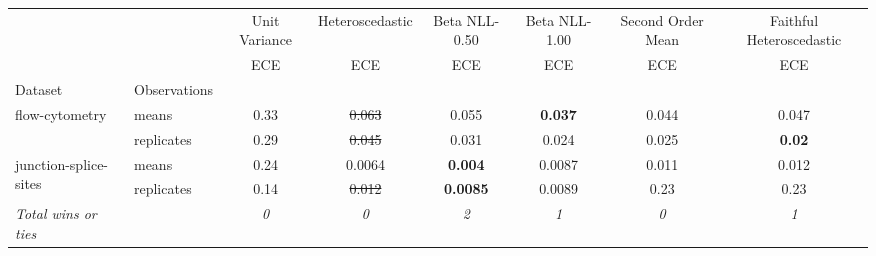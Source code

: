 \begin{tabular}{ll|c|c|c|c|c|c}
\toprule
{} & {} & {Unit Variance} & {Heteroscedastic} & {Beta NLL-0.50} & {Beta NLL-1.00} & {Second Order Mean} & {Faithful Heteroscedastic} \\
{} & {} & {ECE} & {ECE} & {ECE} & {ECE} & {ECE} & {ECE} \\
{Dataset} & {Observations} & {} & {} & {} & {} & {} & {} \\
\midrule
\multirow[c]{2}{*}{flow-cytometry} & means & 0.33 & \sout{0.063} & 0.055 & \textbf{0.037} & 0.044 & 0.047 \\
 & replicates & 0.29 & \sout{0.045} & 0.031 & 0.024 & 0.025 & \textbf{0.02} \\
\multirow[c]{2}{*}{junction-splice-sites} & means & 0.24 & 0.0064 & \textbf{0.004} & 0.0087 & 0.011 & 0.012 \\
 & replicates & 0.14 & \sout{0.012} & \textbf{0.0085} & 0.0089 & 0.23 & 0.23 \\
\textit{{Total wins or ties}} &  & \textit{0} & \textit{0} & \textit{2} & \textit{1} & \textit{0} & \textit{1} \\
\bottomrule
\end{tabular}
